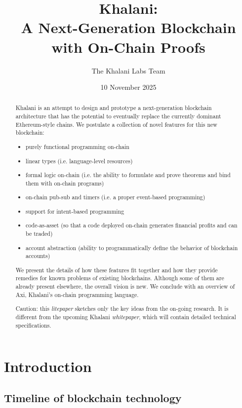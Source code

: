 \documentclass[a4paper]{article}
\title{Khalani: \\ A Next-Generation Blockchain with On-Chain Proofs}
\author{The Khalani Labs Team}
\date{10 November 2025}
\begin{document}
\maketitle

\begin{abstract}
Khalani is an attempt to design and prototype a next-generation blockchain architecture that has the potential to eventually replace the currently dominant Ethereum-style chains. We postulate a collection of novel features for this new blockchain:

\begin{itemize}
  \item purely functional programming on-chain
  \item linear types (i.e. language-level resources)
  \item formal logic on-chain (i.e. the ability to formulate and prove theorems and bind them with on-chain programs)
  \item on-chain pub-sub and timers (i.e. a proper event-based programming)
  \item support for intent-based programming
  \item code-as-asset (so that a code deployed on-chain generates financial profits and can be traded)
  \item account abstraction (ability to programmatically define the behavior of blockchain accounts)
\end{itemize}

We present the details of how these features fit together and how they provide remedies for known problems of existing blockchains. Although some of them are already present elsewhere, the overall vision is new. We conclude with an overview of Axi, Khalani’s on-chain programming language.

Caution: this \textit{litepaper} sketches only the key ideas from the on-going research. It is different from the upcoming Khalani \textit{whitepaper}, which will contain detailed technical specifications.
\end{abstract}

\section{Introduction}

\subsection{Timeline of blockchain technology}
\end{document}
